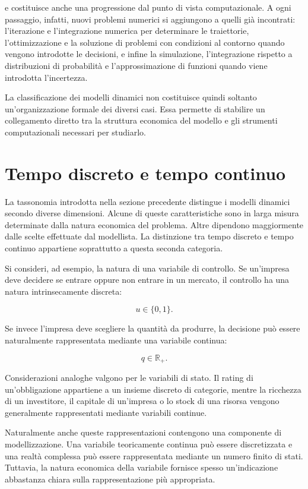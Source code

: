 \documentclass{book}
\begin{document}
e costituisce anche una progressione dal punto di vista computazionale. A ogni passaggio, infatti, nuovi problemi numerici si aggiungono a quelli già incontrati: l'iterazione e l'integrazione numerica per determinare le traiettorie, l'ottimizzazione e la soluzione di problemi con condizioni al contorno quando vengono introdotte le decisioni, e infine la simulazione, l'integrazione rispetto a distribuzioni di probabilità e l'approssimazione di funzioni quando viene introdotta l'incertezza.

La classificazione dei modelli dinamici non costituisce quindi soltanto un'organizzazione formale dei diversi casi. Essa permette di stabilire un collegamento diretto tra la struttura economica del modello e gli strumenti computazionali necessari per studiarlo.




\section{Tempo discreto e tempo continuo}

La tassonomia introdotta nella sezione precedente distingue i modelli dinamici secondo diverse dimensioni. Alcune di queste caratteristiche sono in larga misura determinate dalla natura economica del problema. Altre dipendono maggiormente dalle scelte effettuate dal modellista. La distinzione tra tempo discreto e tempo continuo appartiene soprattutto a questa seconda categoria.

Si consideri, ad esempio, la natura di una variabile di controllo. Se un'impresa deve decidere se entrare oppure non entrare in un mercato, il controllo ha una natura intrinsecamente discreta:

$$
u\in\{0,1\}.
$$

Se invece l'impresa deve scegliere la quantità da produrre, la decisione può essere naturalmente rappresentata mediante una variabile continua:

$$
q\in\mathbb{R}_{+}.
$$

Considerazioni analoghe valgono per le variabili di stato. Il rating di un'obbligazione appartiene a un insieme discreto di categorie, mentre la ricchezza di un investitore, il capitale di un'impresa o lo stock di una risorsa vengono generalmente rappresentati mediante variabili continue.

Naturalmente anche queste rappresentazioni contengono una componente di modellizzazione. Una variabile teoricamente continua può essere discretizzata e una realtà complessa può essere rappresentata mediante un numero finito di stati. Tuttavia, la natura economica della variabile fornisce spesso un'indicazione abbastanza chiara sulla rappresentazione più appropriata.
\end{document}
